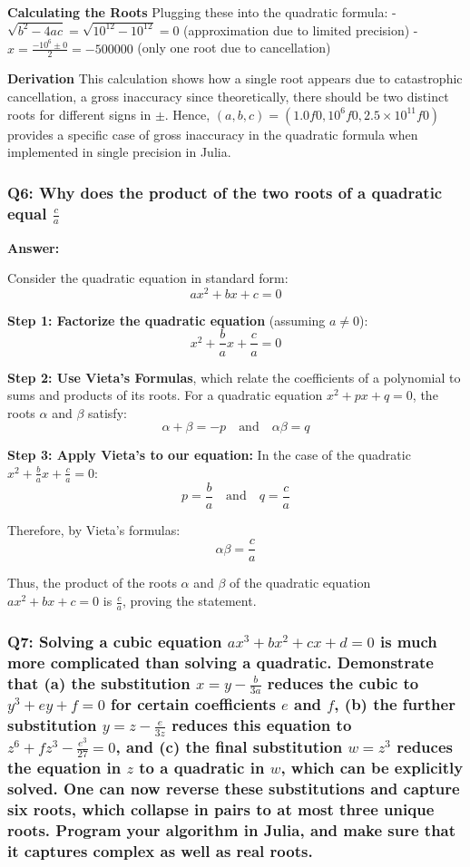 \documentclass[8pt]{article}
\begin{document}
\textbf{Calculating the Roots}
Plugging these into the quadratic formula:
- \( \sqrt{b^2 - 4ac} = \sqrt{10^{12} - 10^{12}} = 0 \) (approximation due to limited precision)
- \( x = \frac{-10^6 \pm 0}{2} = -500000 \) (only one root due to cancellation)

\textbf{Derivation}
This calculation shows how a single root appears due to catastrophic cancellation, a gross inaccuracy since theoretically, there should be two distinct roots for different signs in $\pm$. Hence, $(a, b, c) = (1.0f0, 10^6f0, 2.5 \times 10^{11}f0)$ provides a specific case of gross inaccuracy in the quadratic formula when implemented in single precision in Julia. \\



 \subsubsection*{Q6: Why does the product of the two roots of a quadratic equal $\frac{c}{a}$}

\textbf{Answer:}

Consider the quadratic equation in standard form:
\[ ax^2 + bx + c = 0 \]

\textbf{Step 1: Factorize the quadratic equation }(assuming \(a \neq 0\)):
\[ x^2 + \frac{b}{a}x + \frac{c}{a} = 0 \]

\textbf{Step 2: Use Vieta's Formulas}, which relate the coefficients of a polynomial to sums and products of its roots. For a quadratic equation \(x^2 + px + q = 0\), the roots \(\alpha\) and \(\beta\) satisfy:
\[ \alpha + \beta = -p \quad \text{and} \quad \alpha\beta = q \]

\textbf{Step 3: Apply Vieta's to our equation:}
In the case of the quadratic \(x^2 + \frac{b}{a}x + \frac{c}{a} = 0\):
\[ p = \frac{b}{a} \quad \text{and} \quad q = \frac{c}{a} \]

Therefore, by Vieta's formulas:
\[ \alpha\beta = \frac{c}{a} \]

Thus, the product of the roots \(\alpha\) and \(\beta\) of the quadratic equation \(ax^2 + bx + c = 0\) is \(\frac{c}{a}\), proving the statement.

\subsubsection*{Q7: Solving a cubic equation $ax^3 + bx^2 + cx + d = 0$ is much more complicated than solving a quadratic. Demonstrate that (a) the substitution $x = y - \frac{b}{3a}$ reduces the cubic to $y^3 + ey + f = 0$ for certain coefficients $e$ and $f$, (b) the further substitution $y = z - \frac{e}{3z}$ reduces this equation to $z^6 + fz^3 - \frac{e^3}{27} = 0$, and (c) the final substitution $w = z^3$ reduces the equation in $z$ to a quadratic in $w$, which can be explicitly solved. One can now reverse these substitutions and capture six roots, which collapse in pairs to at most three unique roots. Program your algorithm in Julia, and make sure that it captures complex as well as real roots.}
\end{document}
